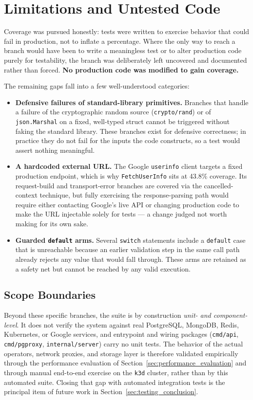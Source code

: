 \section{Limitations and Untested Code}
\label{sec:testing_limitations}

Coverage was pursued honestly: tests were written to exercise behavior that could fail in production, not to inflate a percentage. Where the only way to reach a branch would have been to write a meaningless test or to alter production code purely for testability, the branch was deliberately left uncovered and documented rather than forced. \textbf{No production code was modified to gain coverage.}

The remaining gaps fall into a few well-understood categories:

\begin{itemize}
    \item \textbf{Defensive failures of standard-library primitives.} Branches that handle a failure of the cryptographic random source (\texttt{crypto/rand}) or of \texttt{json.Marshal} on a fixed, well-typed struct cannot be triggered without faking the standard library. These branches exist for defensive correctness; in practice they do not fail for the inputs the code constructs, so a test would assert nothing meaningful.
    \item \textbf{A hardcoded external URL.} The Google \texttt{userinfo} client targets a fixed production endpoint, which is why \texttt{FetchUserInfo} sits at 43.8\% coverage. Its request-build and transport-error branches are covered via the cancelled-context technique, but fully exercising the response-parsing path would require either contacting Google's live API or changing production code to make the URL injectable solely for tests --- a change judged not worth making for its own sake.
    \item \textbf{Guarded \texttt{default} arms.} Several \texttt{switch} statements include a \texttt{default} case that is unreachable because an earlier validation step in the same call path already rejects any value that would fall through. These arms are retained as a safety net but cannot be reached by any valid execution.
\end{itemize}

\subsection{Scope Boundaries}

Beyond these specific branches, the suite is by construction \emph{unit- and component-level}. It does not verify the system against real PostgreSQL, MongoDB, Redis, Kubernetes, or Google services, and entrypoint and wiring packages (\texttt{cmd/api}, \texttt{cmd/pgproxy}, \texttt{internal/server}) carry no unit tests. The behavior of the actual operators, network proxies, and storage layer is therefore validated empirically through the performance evaluation of Section~\ref{sec:performance_evaluation} and through manual end-to-end exercise on the \texttt{k3d} cluster, rather than by this automated suite. Closing that gap with automated integration tests is the principal item of future work in Section~\ref{sec:testing_conclusion}.
